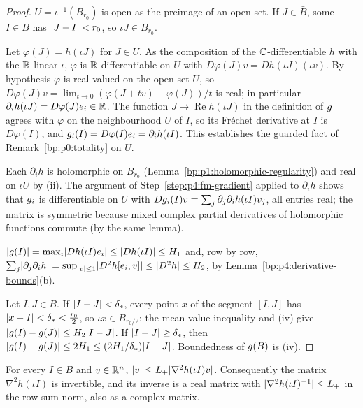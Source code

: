 \begin{proof}
\label{step:p4:fm-domain}
$U=\iota^{-1}(B_{r_0})$ is open as the preimage of an open set. If $J\in\bar B$, some $I\in B$ has
$\lvert J-I\rvert<r_0$, so $\iota J\in B_{r_0}$.

\label{step:p4:fm-gradient}
Let $\varphi(J)=h(\iota J)$ for $J\in U$. As the composition of the $\mathbb{C}$-differentiable $h$ with
the $\mathbb{R}$-linear $\iota$, $\varphi$ is $\mathbb{R}$-differentiable on $U$ with
$D\varphi(J)v=Dh(\iota J)(\iota v)$. By hypothesis $\varphi$ is real-valued on the open set $U$,
so $D\varphi(J)v=\lim_{t\to0}(\varphi(J+tv)-\varphi(J))/t$ is real; in particular
$\partial_ih(\iota J)=D\varphi(J)e_i\in\mathbb{R}$. The function $J\mapsto\operatorname{Re}h(\iota J)$ in the
definition of $g$ agrees with $\varphi$ on the neighbourhood $U$ of $I$, so its Fréchet
derivative at $I$ is $D\varphi(I)$, and $g_i(I)=D\varphi(I)e_i=\partial_ih(\iota I)$. This
establishes the guarded fact of Remark~\ref{bp:p0:totality} on $U$.

\label{step:p4:fm-hessian}
Each $\partial_ih$ is holomorphic on $B_{r_0}$ (Lemma~\ref{bp:p1:holomorphic-regularity}) and real on
$\iota U$ by (ii). The argument of
Step~\ref{step:p4:fm-gradient} applied to $\partial_ih$ shows that $g_i$ is differentiable on
$U$ with $Dg_i(I)v=\sum_j\partial_j\partial_ih(\iota I)v_j$, all entries real; the matrix is
symmetric because mixed complex partial derivatives of holomorphic functions commute (by the same
lemma).

\label{step:p4:fm-bounds}
$\lvert g(I)\rvert=\max_i\lvert Dh(\iota I)e_i\rvert\le\lvert Dh(\iota I)\rvert\le H_1$ and, row by row,
$\sum_j\lvert \partial_j\partial_ih\rvert=\sup_{\lvert v\rvert\le1}\lvert D^2h[e_i,v]\rvert\le\lvert D^2h\rvert\le H_2$, by
Lemma~\ref{bp:p4:derivative-bounds}(b).

\label{step:p4:fm-lipschitz}
Let $I,J\in B$. If $\lvert I-J\rvert<\delta_*$, every point $x$ of the segment $[I,J]$ has
$\lvert x-I\rvert<\delta_*<\frac{r_0}2$, so $\iota x\in B_{r_0/2}$; the mean value inequality and (iv)
give $\lvert g(I)-g(J)\rvert\le H_2\lvert I-J\rvert$. If $\lvert I-J\rvert\ge\delta_*$, then
$\lvert g(I)-g(J)\rvert\le2H_1\le(2H_1/\delta_*)\lvert I-J\rvert$. Boundedness of $g(B)$ is (iv).
\end{proof}

\begin{lemma}\label{bp:p4:hessian-inverse}
For every $I\in B$ and $v\in\mathbb{R}^n$, $\lvert v\rvert\le L_{+}\lvert \nabla^2h(\iota I)v\rvert$. Consequently the
matrix $\nabla^2h(\iota I)$ is invertible, and its inverse is a real matrix with
$\lvert \nabla^2h(\iota I)^{-1}\rvert\le L_{+}$ in the row-sum norm, also as a complex matrix.
\end{lemma}

